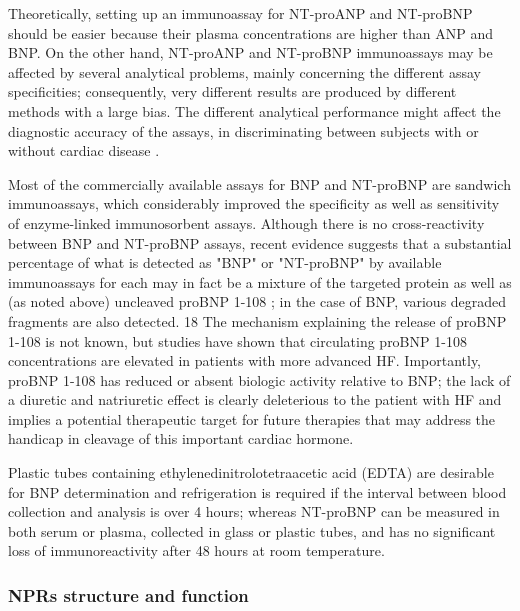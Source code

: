 \documentclass[14pt,a4paper,onecolumn]{extarticle}
\begin{document}
Theoretically, setting up an immunoassay for NT-proANP and NT-proBNP should be easier because their plasma concentrations are higher than ANP and BNP.  On the other hand, NT-proANP and NT-proBNP immunoassays may be affected by several analytical problems, mainly concerning the different assay specificities; consequently, very different results are produced by different methods with a large bias. The different analytical performance might affect the diagnostic accuracy of the assays, in discriminating between subjects with or without cardiac disease \citep{bib32} \citep{bib35} \citep{bib36}. %

Most of the commercially available assays for BNP and NT-proBNP are sandwich immunoassays, which considerably improved the specificity as well as sensitivity of enzyme-linked immunosorbent assays. Although there is no cross-reactivity between BNP and NT-proBNP assays, recent evidence suggests that a substantial percentage of what is detected as "BNP" or "NT-proBNP" by available immunoassays for each may in fact be a mixture of the targeted protein as well as  (as noted above) uncleaved proBNP 1-108 ; in the case of BNP, various degraded fragments are also detected. 18 The mechanism explaining the release of proBNP 1-108 is not known, but studies have shown that circulating proBNP 1-108 concentrations are elevated in patients with more advanced HF. Importantly, proBNP 1-108 has reduced or absent biologic activity relative to BNP; the lack of a diuretic and natriuretic effect is clearly deleterious to the patient with HF and implies a potential therapeutic target for future therapies that may address the handicap in cleavage of this important cardiac hormone. \citep{Gaggin2014} %

Plastic tubes containing ethylenedinitrolotetraacetic acid (EDTA) are desirable for BNP determination and refrigeration is required if the interval between blood collection and analysis is over 4 hours; whereas NT-proBNP can be measured in both serum or plasma, collected in glass or plastic tubes, and has no significant loss of immunoreactivity after 48 hours at room temperature. \citep{Omland2008} %

\subsubsection{NPRs structure and function}
\end{document}
